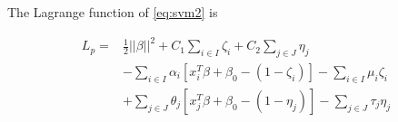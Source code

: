 The Lagrange function of \ref{eq:svm2} is

\begin{equation}
\label{eq:svm3}
\begin{aligned}
    L_p =&  \frac 1 2||\beta||^2 + C_1 \sum_{i\in I} \zeta_i + C_2 \sum_{j\in J} \eta_j\\
        &-\sum_{i \in I}\alpha_i[x_i^T\beta+\beta_0- (1-\zeta_i)]-\sum_{i \in I}\mu_i\zeta_i\\
        &+\sum_{j \in J}\theta_j[x_j^T\beta+\beta_0- (1-\eta_j)]-\sum_{j \in J}\tau_j\eta_j\\
\end{aligned}
\end{equation}



%
%


